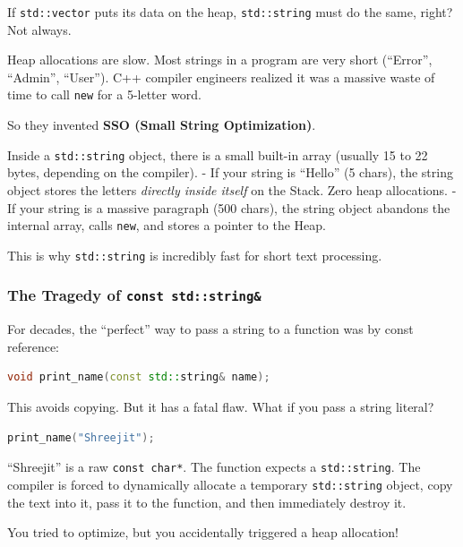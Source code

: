 If \passthrough{\lstinline!std::vector!} puts its data on the heap,
\passthrough{\lstinline!std::string!} must do the same, right? Not
always.

Heap allocations are slow. Most strings in a program are very short
(``Error'', ``Admin'', ``User''). C++ compiler engineers realized it was
a massive waste of time to call \passthrough{\lstinline!new!} for a
5-letter word.

So they invented \textbf{SSO (Small String Optimization)}.

Inside a \passthrough{\lstinline!std::string!} object, there is a small
built-in array (usually 15 to 22 bytes, depending on the compiler). - If
your string is ``Hello'' (5 chars), the string object stores the letters
\emph{directly inside itself} on the Stack. Zero heap allocations. - If
your string is a massive paragraph (500 chars), the string object
abandons the internal array, calls \passthrough{\lstinline!new!}, and
stores a pointer to the Heap.

This is why \passthrough{\lstinline!std::string!} is incredibly fast for
short text processing.

\hypertarget{the-tragedy-of-const-stdstring}{%
\subsubsection{\texorpdfstring{The Tragedy of
\texttt{const\ std::string\&}}{The Tragedy of const std::string\&}}\label{the-tragedy-of-const-stdstring}}

For decades, the ``perfect'' way to pass a string to a function was by
const reference:

\begin{lstlisting}[language={C++}]
void print_name(const std::string& name);
\end{lstlisting}

This avoids copying. But it has a fatal flaw. What if you pass a string
literal?

\begin{lstlisting}[language={C++}]
print_name("Shreejit");
\end{lstlisting}

``Shreejit'' is a raw \passthrough{\lstinline!const char*!}. The
function expects a \passthrough{\lstinline!std::string!}. The compiler
is forced to dynamically allocate a temporary
\passthrough{\lstinline!std::string!} object, copy the text into it,
pass it to the function, and then immediately destroy it.

You tried to optimize, but you accidentally triggered a heap allocation!

